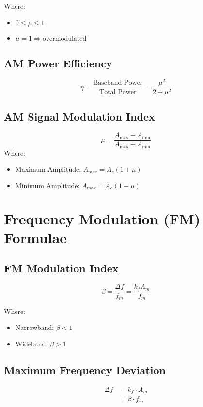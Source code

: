 \documentclass[10pt]{article}
\begin{document}
\noindent Where:
\begin{itemize}
	\item $0 \leq \mu \leq 1$
	\item $\mu = 1 \Rightarrow \text{overmodulated}$
\end{itemize}

\subsection{AM Power Efficiency}
\[
	\eta = \frac{\text{Baseband Power}}{\text{Total Power}} = \frac{\mu^2}{2 + \mu^2}
\]

\subsection{AM Signal Modulation Index}
\[
	\mu = \frac{A_{\text{max}} - A_{\text{min}}}{A_{\text{max}} + A_{\text{min}}}
\]
\noindent Where:
\begin{itemize}
	\item Maximum Amplitude: $A_{\text{max}} = A_c(1+\mu)$
	\item Minimum Amplitude: $A_{\text{max}} = A_c(1-\mu)$
\end{itemize}

\section{Frequency Modulation (FM) Formulae}

\subsection{FM Modulation Index}
\[
	\beta = \frac{\Delta f}{f_m} = \frac{k_f A_m}{f_m}
\]

\noindent Where:
\begin{itemize}
	\item Narrowband: \( \beta < 1 \)
	\item Wideband: \( \beta > 1 \)
\end{itemize}

\subsection{Maximum Frequency Deviation}
\begin{align*}
	\Delta f & = k_f \cdot A_m   \\
	         & = \beta \cdot f_m
\end{align*}
\end{document}
